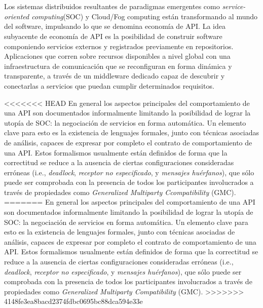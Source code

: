 \chapter*{\runtitulo}

Los sistemas distribuidos resultantes de paradigmas emergentes como \emph{service-oriented computing}(SOC) y Cloud/Fog computing están transformando al mundo del software, impulsando lo que se denomina economía de API. La idea subyacente de economía de API es la posibilidad de construir software componiendo servicios externos y registrados previamente en repositorios. Aplicaciones que corren sobre recursos disponibles a nivel global con una infraestructura de comunicación que se reconfiguran en forma dinámica y transparente, a través de un middleware dedicado capaz de descubrir y conectarlas a servicios que puedan cumplir determinados requisitos. 

<<<<<<< HEAD
En general los aspectos principales del comportamiento de una API son documentados informalmente limitando la posibilidad de lograr la utopía de SOC: la negociación de servicios en forma automática. Un elemento clave para esto es la existencia de lenguajes formales, junto con técnicas asociadas de análisis, capaces de expresar por completo el contrato de comportamiento de una API. Estos formalismos usualmente están definidos de forma que la correctitud se reduce a la ausencia de ciertas configuraciones consideradas erróneas (i.e., \emph{deadlock}, \emph{receptor no especificado}, y \emph{mensajes huérfanos}), que sólo puede ser comprobada con la presencia de todos los participantes involucrados a través de propiedades como \emph{Generalized Multiparty Ccompatibility} (GMC).
=======
En general los aspectos principales del comportamiento de una API son documentados informalmente limitando la posibilidad de lograr la utopía de SOC: la negociación de servicios en forma automática. Un elemento clave para esto es la existencia de lenguajes formales, junto con técnicas asociadas de análisis, capaces de expresar por completo el contrato de comportamiento de una API. Estos formalismos usualmente están definidos de forma que la correctitud se reduce a la ausencia de ciertas configuraciones consideradas erróneas (i.e., \emph{deadlock}, \emph{receptor no especificado}, y \emph{mensajes huérfanos}), que sólo puede ser comprobada con la presencia de todos los participantes involucrados a través de propiedades como \emph{Generalized Multiparty Compatibility} (GMC).
>>>>>>> 4148fe3ea8bacd2374fdbc0695bc88dca594e33e

